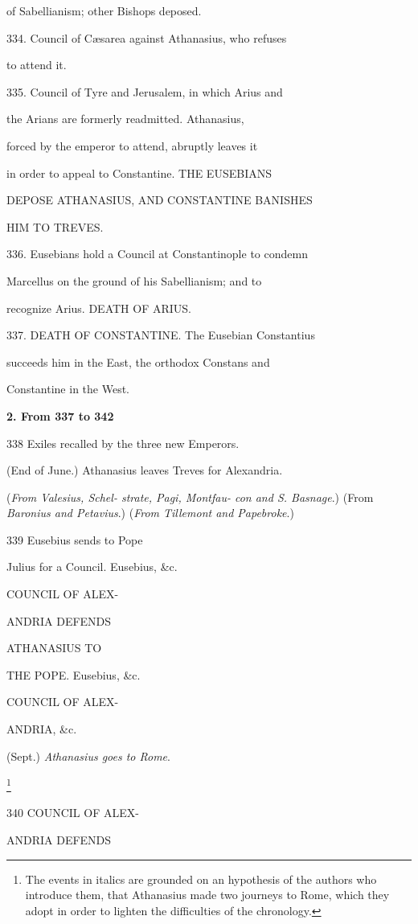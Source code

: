 of Sabellianism; other Bishops deposed.

334.
Council of Cæsarea against Athanasius, who
refuses

to attend it.

335.
Council of Tyre and Jerusalem, in which Arius
and

the Arians are formerly readmitted. Athanasius,

forced by the emperor to attend, abruptly leaves it

in order to appeal to Constantine. THE EUSEBIANS

DEPOSE ATHANASIUS,
AND CONSTANTINE BANISHES

HIM TO TREVES.

336.
Eusebians hold a Council at Constantinople to
condemn

Marcellus on the ground of his Sabellianism; and to

recognize Arius. DEATH OF
ARIUS.

337.
DEATH OF
CONSTANTINE. The Eusebian Constantius

succeeds him in the East, the orthodox Constans and

Constantine in the West.

\textbf{2. From 337 to 342}

338
Exiles
recalled by the three new Emperors.

(End of June.) Athanasius leaves Treves for Alexandria.

(\emph{From Valesius,
Schel- strate, Pagi, Montfau- con and S. Basnage}.)
(From \emph{Baronius and Petavius}.)
(\emph{From Tillemont and Papebroke}.)

339
Eusebius sends to Pope

Julius for a Council.
Eusebius, \&c.

COUNCIL OF
ALEX-

ANDRIA DEFENDS

ATHANASIUS TO

THE POPE.
Eusebius, \&c.

COUNCIL OF ALEX-

ANDRIA, \&c.

(Sept.) \emph{Athanasius goes to Rome}.

\footnote{The events in italics are grounded on an hypothesis of
the authors who introduce them, that Athanasius made two journeys to
Rome, which they adopt in order to lighten the difficulties of the
chronology.}

340
COUNCIL OF
ALEX-

ANDRIA DEFENDS

